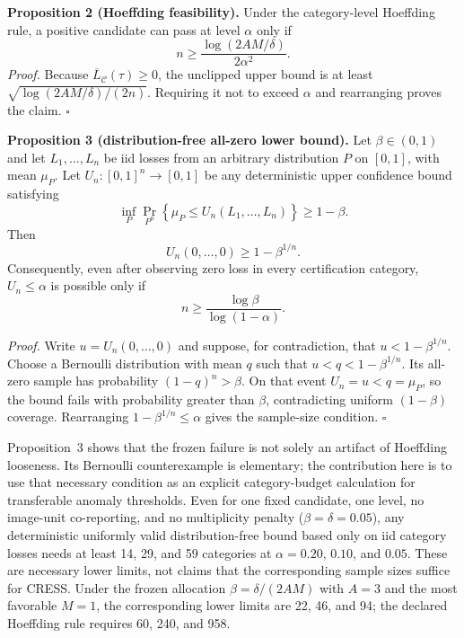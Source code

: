 \noindent\textbf{Proposition 2 (Hoeffding feasibility).} Under the category-level Hoeffding rule, a positive candidate can pass at level $\alpha$ only if
\begin{equation}\label{eq:sc3r-feasibility}
    n\geq\frac{\log(2AM/\delta)}{2\alpha^2}.
\end{equation}
\noindent\emph{Proof.} Because $\overline{L}_{\mathcal C}(\tau)\geq0$, the unclipped upper bound is at least $\sqrt{\log(2AM/\delta)/(2n)}$. Requiring it not to exceed $\alpha$ and rearranging proves the claim. \hfill$\square$

\noindent\textbf{Proposition 3 (distribution-free all-zero lower bound).}
Let $\beta\in(0,1)$ and let $L_1,\ldots,L_n$ be iid losses from an arbitrary distribution $P$ on $[0,1]$, with mean $\mu_P$. Let $U_n:[0,1]^n\to[0,1]$ be any deterministic upper confidence bound satisfying
\[
    \inf_{P}\Pr_{P^n}\!\left\{\mu_P\leq U_n(L_1,\ldots,L_n)\right\}\geq1-\beta.
\]
Then
\begin{equation}\label{eq:distribution-free-feasibility}
    U_n(0,\ldots,0)\geq1-\beta^{1/n}.
\end{equation}
Consequently, even after observing zero loss in every certification category, $U_n\leq\alpha$ is possible only if
\[
    n\geq\frac{\log\beta}{\log(1-\alpha)}.
\]

\noindent\emph{Proof.}
Write $u=U_n(0,\ldots,0)$ and suppose, for contradiction, that $u<1-\beta^{1/n}$. Choose a Bernoulli distribution with mean $q$ such that $u<q<1-\beta^{1/n}$. Its all-zero sample has probability $(1-q)^n>\beta$. On that event $U_n=u<q=\mu_P$, so the bound fails with probability greater than $\beta$, contradicting uniform $(1-\beta)$ coverage. Rearranging $1-\beta^{1/n}\leq\alpha$ gives the sample-size condition. \hfill$\square$

Proposition~3 shows that the frozen failure is not solely an artifact of Hoeffding looseness. Its Bernoulli counterexample is elementary; the contribution here is to use that necessary condition as an explicit category-budget calculation for transferable anomaly thresholds. Even for one fixed candidate, one level, no image-unit co-reporting, and no multiplicity penalty ($\beta=\delta=0.05$), any deterministic uniformly valid distribution-free bound based only on iid category losses needs at least 14, 29, and 59 categories at $\alpha=0.20$, $0.10$, and $0.05$. These are necessary lower limits, not claims that the corresponding sample sizes suffice for CRESS. Under the frozen allocation $\beta=\delta/(2AM)$ with $A=3$ and the most favorable $M=1$, the corresponding lower limits are 22, 46, and 94; the declared Hoeffding rule requires 60, 240, and 958.

